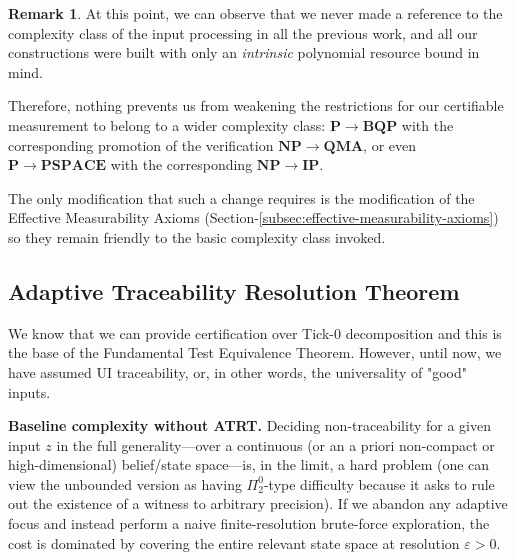 \documentclass[12pt]{article}
\theoremstyle{definition}
\newtheorem{remark}{Remark}[section]
\theoremstyle{plain}
\begin{document}
\begin{remark}
    At this point, we can observe that we never made a reference to the complexity class of the input processing in all the previous work, and all our constructions were built with only an \emph{intrinsic} polynomial resource bound in mind.
    
    Therefore, nothing prevents us from weakening the restrictions for our certifiable measurement to belong to a wider complexity class: $\mathbf{P} \longrightarrow \mathbf{BQP}$ with the corresponding promotion of the verification $\mathbf{NP} \longrightarrow \mathbf{QMA}$, or even $\mathbf{P} \longrightarrow \mathbf{PSPACE}$ with the corresponding $\mathbf{NP} \longrightarrow \mathbf{IP}$.
    
    The only modification that such a change requires is the modification of the Effective Measurability Axioms (Section-\ref{subsec:effective-measurability-axioms}) so they remain friendly to the basic complexity class invoked.
\end{remark}

\subsection{Adaptive Traceability Resolution Theorem}

We know that we can provide certification over Tick-0 decomposition and this is the base of the Fundamental Test Equivalence Theorem. However, until now, we have assumed UI traceability, or, in other words, the universality of "good" inputs.

\medskip\noindent\textbf{Baseline complexity without ATRT.}  
Deciding non-traceability for a given input \(z\) in the full generality—over a continuous (or an a priori non-compact or high-dimensional) belief/state space—is, in the limit, a hard problem (one can view the unbounded version as having \(\Pi^0_2\)-type difficulty because it asks to rule out the existence of a witness to arbitrary precision).  If we abandon any adaptive focus and instead perform a naive finite-resolution brute-force exploration, the cost is dominated by covering the entire relevant state space at resolution \(\varepsilon>0\).
\end{document}
